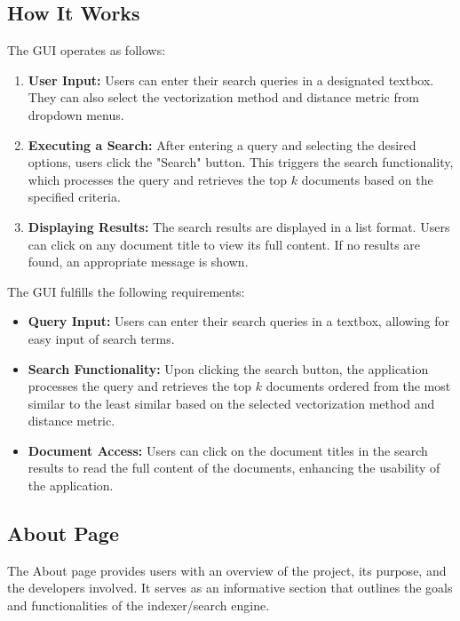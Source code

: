 \documentclass{article}
\begin{document}
\subsection{How It Works}
The GUI operates as follows:
\begin{enumerate}
    \item \textbf{User Input:} Users can enter their search queries in a designated textbox. They can also select the vectorization method and distance metric from dropdown menus.
    \item \textbf{Executing a Search:} After entering a query and selecting the desired options, users click the "Search" button. This triggers the search functionality, which processes the query and retrieves the top \( k \) documents based on the specified criteria.
    \item \textbf{Displaying Results:} The search results are displayed in a list format. Users can click on any document title to view its full content. If no results are found, an appropriate message is shown.
\end{enumerate}

The GUI fulfills the following requirements:
\begin{itemize}
    \item \textbf{Query Input:} Users can enter their search queries in a textbox, allowing for easy input of search terms.
    \item \textbf{Search Functionality:} Upon clicking the search button, the application processes the query and retrieves the top \( k \) documents ordered from the most similar to the least similar based on the selected vectorization method and distance metric.
    \item \textbf{Document Access:} Users can click on the document titles in the search results to read the full content of the documents, enhancing the usability of the application.
\end{itemize}

\subsection{About Page}
The About page provides users with an overview of the project, its purpose, and the developers involved. It serves as an informative section that outlines the goals and functionalities of the indexer/search engine. 
\end{document}
